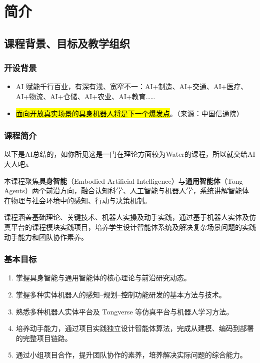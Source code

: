 \section{简介}

\subsection{课程背景、目标及教学组织}

\subsubsection{开设背景}

\begin{itemize}
    \item AI 赋能千行百业，有深有浅、宽窄不一：AI+制造、AI+交通、AI+医疗、AI+物流、AI+仓储、AI+农业、AI+教育……
    \item \hl{面向开放真实场景的具身机器人将是下一个爆发点}。（来源：中国信通院）
\end{itemize}

\subsubsection{课程简介}

以下是AI总结的，如你所见这是一门在理论方面较为Water的课程，所以就交给AI大人吧x

本课程聚焦\textbf{具身智能}（Embodied Artificial Intelligence）与\textbf{通用智能体}（Tong Agents）两个前沿方向，融合认知科学、人工智能与机器人学，系统讲解智能体在物理与社会环境中的感知、行动与决策机制。

课程涵盖基础理论、关键技术、机器人实操及动手实践，通过基于机器人实体及仿真平台的课程模块实践项目，培养学生设计智能体系统及解决复杂场景问题的实践动手能力和团队协作素养。

\subsubsection{基本目标}

\begin{enumerate}[itemsep=2pt]
    \item 掌握具身智能与通用智能体的核心理论与前沿研究动态。
    \item 掌握多种实体机器人的感知--规划--控制功能研发的基本方法与技术。
    \item 熟悉多种机器人实体平台及 Tongverse 等仿真平台与机器人学习方法。
    \item 培养动手能力，通过项目实践独立设计智能体算法，完成从建模、编码到部署的完整项目链路。
    \item 通过小组项目合作，提升团队协作的素养，培养解决实际问题的综合能力。
\end{enumerate}

